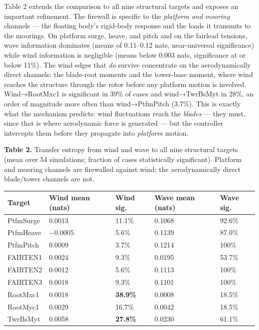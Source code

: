 \documentclass[
  english,
  11pt,
]{article}
\begin{document}
Table 2 extends the comparison to all nine structural targets and
exposes an important refinement. The firewall is specific to the
\emph{platform and mooring} channels --- the floating body's rigid-body
response and the loads it transmits to the moorings. On platform surge,
heave, and pitch and on the fairlead tensions, wave information
dominates (means of 0.11--0.12 nats, near-universal significance) while
wind information is negligible (means below 0.003 nats, significance at
or below 11\%). The wind edges that \emph{do} survive concentrate on the
aerodynamically direct channels: the blade-root moments and the
tower-base moment, where wind reaches the structure through the rotor
before any platform motion is involved. Wind→RootMxc1 is significant in
39\% of cases and wind→TwrBsMyt in 28\%, an order of magnitude more
often than wind→PtfmPitch (3.7\%). This is exactly what the mechanism
predicts: wind fluctuations reach the \emph{blades} --- they must, since
that is where aerodynamic force is generated --- but the controller
intercepts them before they propagate into \emph{platform} motion.

\textbf{Table 2.} Transfer entropy from wind and wave to all nine
structural targets (mean over 54 simulations; fraction of cases
statistically significant). Platform and mooring channels are firewalled
against wind; the aerodynamically direct blade/tower channels are not.

\begin{longtable}[]{@{}lllll@{}}
\toprule\noalign{}
Target & Wind mean (nats) & Wind sig. & Wave mean (nats) & Wave sig. \\
\midrule\noalign{}
\endhead
\bottomrule\noalign{}
\endlastfoot
PtfmSurge & 0.0013 & 11.1\% & 0.1068 & 92.6\% \\
PtfmHeave & −0.0005 & 5.6\% & 0.1139 & 87.0\% \\
PtfmPitch & 0.0009 & 3.7\% & 0.1214 & 100\% \\
FAIRTEN1 & 0.0024 & 9.3\% & 0.0195 & 53.7\% \\
FAIRTEN2 & 0.0012 & 5.6\% & 0.1113 & 100\% \\
FAIRTEN3 & 0.0018 & 9.3\% & 0.1101 & 100\% \\
RootMxc1 & 0.0018 & \textbf{38.9\%} & 0.0008 & 18.5\% \\
RootMyc1 & 0.0029 & 16.7\% & 0.0042 & 18.5\% \\
TwrBsMyt & 0.0058 & \textbf{27.8\%} & 0.0230 & 61.1\% \\
\end{longtable}
\end{document}

